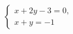\begin{ex}
	\begin{condition}
		\( \left\{
		\begin{array}{l}
			x+2y-3=0,\\
			x+y=-1
		\end{array}
		\right. \)
	\end{condition}
\end{ex}